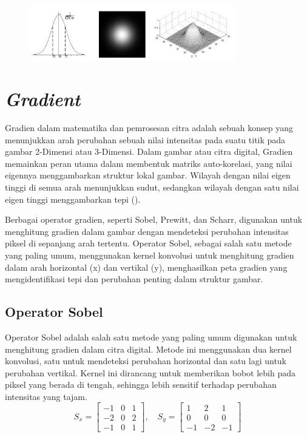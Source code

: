 \begin{figure}
  \centering{}
  \includegraphics[width=0.8\textwidth]{gambar/Uniform Gaussian kernel.jpg}
  \caption{}
\end{figure}

\section{\emph{Gradient}}
  Gradien dalam matematika dan pemrosesan citra adalah sebuah konsep yang menunjukkan arah perubahan sebuah nilai intensitas pada suatu titik pada gambar 2-Dimensi atau 3-Dimensi. 
Dalam gambar atau citra digital, Gradien memainkan peran utama dalam membentuk matriks auto-korelasi, yang nilai eigennya menggambarkan struktur lokal gambar. 
Wilayah dengan nilai eigen tinggi di semua arah menunjukkan sudut, sedangkan wilayah dengan satu nilai eigen tinggi menggambarkan tepi (\cite[hlm. 305--306]{Sanchez2018}).

  Berbagai operator gradien, seperti Sobel, Prewitt, dan Scharr, digunakan untuk menghitung gradien dalam gambar dengan mendeteksi perubahan intensitas piksel di sepanjang arah tertentu. 
Operator Sobel, sebagai salah satu metode yang paling umum, menggunakan kernel konvolusi untuk menghitung gradien dalam arah horizontal (x) dan vertikal (y), menghasilkan peta gradien yang mengidentifikasi tepi dan perubahan penting dalam struktur gambar.
\subsection{Operator Sobel}
  Operator Sobel adalah salah satu metode yang paling umum digunakan untuk menghitung gradien dalam citra digital. Metode ini menggunakan dua kernel konvolusi, satu untuk mendeteksi perubahan horizontal dan satu lagi untuk perubahan vertikal. Kernel ini dirancang untuk memberikan bobot lebih pada piksel yang berada di tengah, sehingga lebih sensitif terhadap perubahan intensitas yang tajam.
\begin{equation}
  S_x = \begin{bmatrix}
    -1 & 0 & 1 \\
    -2 & 0 & 2 \\
    -1 & 0 & 1
  \end{bmatrix}, \quad
  S_y = \begin{bmatrix}
    1 & 2 & 1 \\
    0 & 0 & 0 \\
    -1 & -2 & -1
  \end{bmatrix}
  \label{eq:sobel-kernel}
\end{equation}

